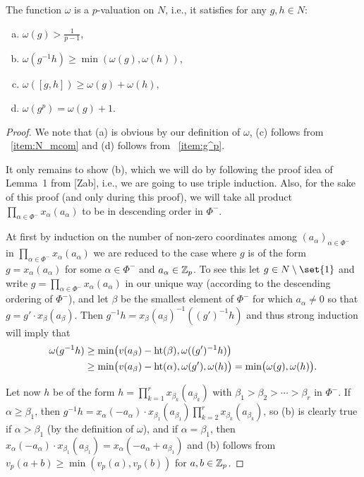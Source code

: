 \begin{proposition}
  The function $\omega$ is a $p$-valuation on $N$, i.e., it satisfies for any $g,h \in N$:
  \begin{enumerate}[(a)]
  \item $\omega(g) > \frac{1}{p-1}$,
  \item $\omega(g^{-1}h) \geq \min(\omega(g),\omega(h))$,
  \item $\omega([g,h]) \geq \omega(g) + \omega(h)$,
  \item $\omega(g^p) = \omega(g) + 1$.
  \end{enumerate}
\end{proposition}
\begin{proof}
  We note that (a) is obvious by our definition of $\omega$, (c) follows from ~\ref{item:N_mcom} and (d) follows from ~\ref{item:g^p}.

  It only remains to show (b), which we will do by following the proof idea of Lemma~1 from [Zab], i.e., we are going to use triple induction. Also, for the sake of this proof (and only during this proof), we will take all product $\prod_{\alpha \in \Phi^{-}} x_\alpha(a_\alpha)$ to be in descending order in $\Phi^{-}$.

  At first by induction on the number of non-zero coordinates among $(a_\alpha)_{\alpha \in \Phi^{-}}$ in $\prod_{\alpha \in \Phi^{-}} x_\alpha(a_\alpha)$ we are reduced to the case where $g$ is of the form $g = x_\alpha(a_\alpha)$ for some $\alpha \in \Phi^{-}$ and $a_\alpha \in \mathbb{Z}_p$. To see this let $g \in N \setminus \set{1}$ and write $g = \prod_{\alpha \in \Phi^{-}} x_\alpha(a_\alpha)$ in our unique way (according to the descending ordering of $\Phi^{-}$), and let $\beta$ be the smallest element of $\Phi^{-}$ for which $a_\alpha \neq 0$ so that $g = g' \cdot x_\beta(a_\beta)$. Then $g^{-1}h = x_\beta(a_\beta)^{-1}((g')^{-1}h)$ and thus strong induction will imply that
\begin{align*}
  \omega(g^{-1}h) &\geq \min\bigl( v(a_\beta)-\operatorname{ht}(\beta),\omega((g')^{-1}h) \bigr) \\
  &\geq \min\bigl( v(a_\beta)-\operatorname{ht}(\alpha),\omega(g'),\omega(h) \bigr) = \min\bigl( \omega(g),\omega(h) \bigr).
\end{align*}

Let now $h$ be of the form $h = \prod_{k=1}^r x_{\beta_k}(a_{\beta_k})$ with $\beta_1 > \beta_2 > \dotsb > \beta_r$ in $\Phi^{-}$. If $\alpha \geq \beta_1$, then $g^{-1}h = x_\alpha(-a_\alpha) \cdot x_{\beta_1}(a_{\beta_1})  \prod_{k=2}^r x_{\beta_k}(a_{\beta_k})$, so (b) is clearly true if $\alpha > \beta_1$ (by the definition of $\omega$), and if $\alpha = \beta_1$, then $x_\alpha(-a_\alpha) \cdot x_{\beta_1}(a_{\beta_1}) = x_\alpha(-a_\alpha + a_{\beta_1})$ and (b) follows from $v_p(a+b) \geq \min(v_p(a),v_p(b))$ for $a,b \in \mathbb{Z}_p$.


\end{proof}
